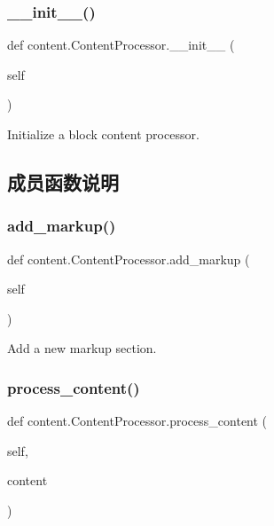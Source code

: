 \subsubsection{\texorpdfstring{\+\_\+\+\_\+init\+\_\+\+\_\+()}{\_\_init\_\_()}}
{\footnotesize\ttfamily def content.\+Content\+Processor.\+\_\+\+\_\+init\+\_\+\+\_\+ (\begin{DoxyParamCaption}\item[{}]{self }\end{DoxyParamCaption})}

\begin{DoxyVerb}Initialize a block content processor.\end{DoxyVerb}
 

\subsection{成员函数说明}
\mbox{\label{classcontent_1_1_content_processor_a80c9aef136880bba3d0575785bcc1794}} 
\subsubsection{\texorpdfstring{add\+\_\+markup()}{add\_markup()}}
{\footnotesize\ttfamily def content.\+Content\+Processor.\+add\+\_\+markup (\begin{DoxyParamCaption}\item[{}]{self }\end{DoxyParamCaption})}

\begin{DoxyVerb}Add a new markup section.\end{DoxyVerb}
 \mbox{\label{classcontent_1_1_content_processor_ad0b20f704dbd7460afd09fa05b898b1a}} 
\subsubsection{\texorpdfstring{process\+\_\+content()}{process\_content()}}
{\footnotesize\ttfamily def content.\+Content\+Processor.\+process\+\_\+content (\begin{DoxyParamCaption}\item[{}]{self,  }\item[{}]{content }\end{DoxyParamCaption})}

